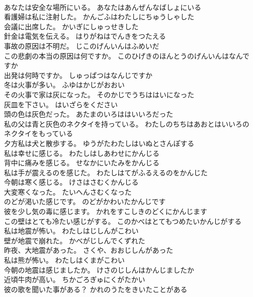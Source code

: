 \documentclass[8pt]{extreport}
\begin{document}
\begin{CJK}{UTF8}{min}
\\	あなたは安全な場所にいる。	あなたはあんぜんなばしょにいる 
\\	看護婦は私に注射した。	かんごふはわたしにちゅうしゃした 
\\	会議に出席した。	かいぎにしゅっせきした 
\\	針金は電気を伝える。	はりがねはでんきをつたえる 
\\	事故の原因は不明だ。	じこのげんいんはふめいだ 
\\	この悲劇の本当の原因は何ですか。	このひげきのほんとうのげんいんはなんですか 
\\	出発は何時ですか。	しゅっぱつはなんじですか 
\\	冬は火事が多い。	ふゆはかじがおおい 
\\	その火事で家は灰になった。	そのかじでうちははいになった 
\\	灰皿を下さい。	はいざらをください 
\\	頭の色は灰色だった。	あたまのいろははいいろだった 
\\	私の父は青と灰色のネクタイを持っている。	わたしのちちはあおとはいいろのネクタイをもっている 
\\	夕方私は犬と散歩する。	ゆうがたわたしはいぬとさんぽする 
\\	私は幸せに感じる。	わたしはしあわせにかんじる 
\\	背中に痛みを感じる。	せなかにいたみをかんじる 
\\	私は手が震えるのを感じた。	わたしはてがふるえるのをかんじた 
\\	今朝は寒く感じる。	けさはさむくかんじる 
\\	大変寒くなった。	たいへんさむくなった 
\\	のどが渇いた感じです。	のどがかわいたかんじです 
\\	彼を少し気の毒に感じます。	かれをすこしきのどくにかんじます 
\\	この壁はとても冷たい感じがする。	このかべはとてもつめたいかんじがする 
\\	私は地震が怖い。	わたしはじしんがこわい 
\\	壁が地震で崩れた。	かべがじしんでくずれた 
\\	昨夜、大地震があった。	さくや、おおじしんがあった 
\\	私は熊が怖い。	わたしはくまがこわい 
\\	今朝の地震は感じましたか。	けさのじしんはかんじましたか 
\\	近頃牛肉が高い。	ちかごろぎゅにくがたかい 
\\	彼の歌を聞いた事がある？	かれのうたをきいたことがある 

\end{CJK}
\end{document}
